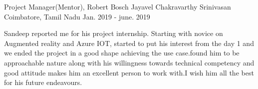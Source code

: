 


\begin{cventries}

  \cventry
    {Project Manager(Mentor), Robert Bosch} %
    {Jayavel Chakravarthy Srinivasan} %
    {Coimbatore, Tamil Nadu} %
    {Jan. 2019 - june. 2019} %
    {
      \begin{cvitems} %
        \item {Sandeep reported me for his project internship. Starting with novice on Augmented reality and Azure IOT, \newline started to put his interest from the day 1 and we ended the project in a good shape achieving the use case.found \newline him to be approachable nature along with his willingness towards technical competency and good attitude makes him an excellent person to work with.I wish him all the best for his future endeavours.}
      \end{cvitems}
    }




\end{cventries}
